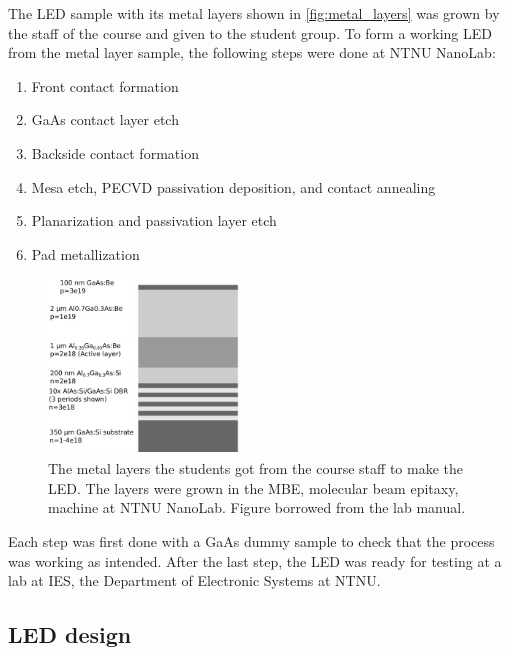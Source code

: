 
The LED sample with its metal layers shown in \autoref{fig:metal_layers} was grown by the staff of the course and given to the student group.
To form a working LED from the metal layer sample, the following steps were done at NTNU NanoLab:

\begin{enumerate}
    \item Front contact formation
    \item GaAs contact layer etch
    \item Backside contact formation
    \item Mesa etch, PECVD passivation deposition, and contact annealing
    \item Planarization and passivation layer etch
    \item Pad metallization
\end{enumerate}

\begin{figure}[h]
    \centering
    \includegraphics[width=0.45\textwidth]{figures/metal_layers.jpg}
    \caption{
        The metal layers the students got from the course staff to make the LED.
        The layers were grown in the MBE, molecular beam epitaxy, machine at NTNU NanoLab.
        Figure borrowed from the lab manual.
    }
    \label{fig:metal_layers}

\end{figure}

Each step was first done with a GaAs dummy sample to check that the process was working as intended.
After the last step, the LED was ready for testing at a lab at IES, the Department of Electronic Systems at NTNU.


\subsection{LED design}
\label{methods:led_design}

